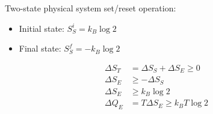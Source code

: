    Two-state physical system set/reset operation:
    \begin{itemize}
    \item Initial state: $S^i_S=k_B \log2$
    \item Final state: $S^f_S=-k_B \log2$
    \end{itemize}
    \begin{align*}
    \Delta S_T &= \Delta S_S + \Delta S_E \ge 0 \\
    \Delta S_E &\geq - \Delta S_S \\ 
    \Delta S_E &\geq k_B\log 2\\
    \Delta Q_E &= T \Delta S_E \geq k_B T \log 2 \\
    \end{align*}
    
